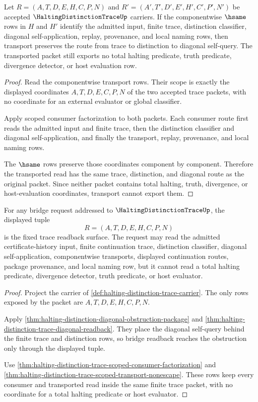 \begin{theorem}
\label{thm:halting-distinction-trace-scoped-transport-nonescape}
Let $R=(A,T,D,E,H,C,P,N)$ and $R'=(A',T',D',E',H',C',P',N')$ be accepted $\HaltingDistinctionTraceUp$ carriers. If the componentwise $\hsame$ rows in $H$ and $H'$ identify the admitted input, finite trace, distinction classifier, diagonal self-application, replay, provenance, and local naming rows, then transport preserves the route from trace to distinction to diagonal self-query. The transported packet still exports no total halting predicate, truth predicate, divergence detector, or host evaluation row.
\end{theorem}
\begin{proof}
Read the componentwise transport rows. Their scope is exactly the displayed coordinates $A,T,D,E,C,P,N$ of the two accepted trace packets, with no coordinate for an external evaluator or global classifier.

Apply scoped consumer factorization to both packets. Each consumer route first reads the admitted input and finite trace, then the distinction classifier and diagonal self-application, and finally the transport, replay, provenance, and local naming rows.

The $\hsame$ rows preserve those coordinates component by component. Therefore the transported read has the same trace, distinction, and diagonal route as the original packet. Since neither packet contains total halting, truth, divergence, or host-evaluation coordinates, transport cannot export them.
\end{proof}

\begin{theorem}
\label{thm:halting-distinction-trace-bridge-readback}
For any bridge request addressed to $\HaltingDistinctionTraceUp$, the displayed tuple
$$
R=(A,T,D,E,H,C,P,N)
$$
is the fixed trace readback surface. The request may read the admitted certificate-history input, finite continuation trace, distinction classifier, diagonal self-application, componentwise transports, displayed continuation routes, package provenance, and local naming row, but it cannot read a total halting predicate, divergence detector, truth predicate, or host evaluator.
\end{theorem}
\begin{proof}
Project the carrier of \autoref{def:halting-distinction-trace-carrier}. The only rows exposed by the packet are $A,T,D,E,H,C,P,N$.

Apply \autoref{thm:halting-distinction-diagonal-obstruction-package} and \autoref{thm:halting-distinction-trace-diagonal-readback}. They place the diagonal self-query behind the finite trace and distinction rows, so bridge readback reaches the obstruction only through the displayed tuple.

Use \autoref{thm:halting-distinction-trace-scoped-consumer-factorization} and \autoref{thm:halting-distinction-trace-scoped-transport-nonescape}. These rows keep every consumer and transported read inside the same finite trace packet, with no coordinate for a total halting predicate or host evaluator.
\end{proof}

